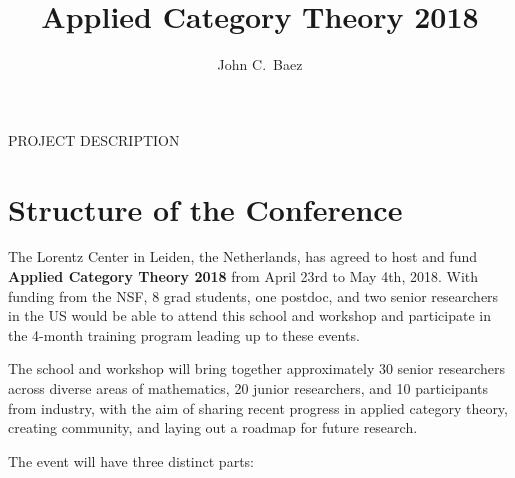 \documentclass[12pt]{amsart}
\newcommand{\ctr}[1]{\begin{center} #1 \end{center}}
\begin{document}
\ctr{\large PROJECT DESCRIPTION}
\title{Applied Category Theory 2018}
\author{John C.\ Baez}

\maketitle

\section{Structure of the Conference}

The Lorentz Center in Leiden, the Netherlands, has agreed to host and fund
\textbf{Applied Category Theory 2018} from April 23rd to May 4th, 2018.
With funding from the NSF, 8 grad students, one postdoc, and two
senior researchers in the US would be able to attend this school and workshop and participate 
in the 4-month training program leading up to these events.

The school and workshop will bring together
approximately 30 senior researchers across diverse areas of mathematics,
20 junior researchers, and 10 participants from industry, with the aim
of sharing recent progress in applied category theory, creating community, and
laying out a roadmap for future research.

The event will have three distinct parts:
\end{document}
